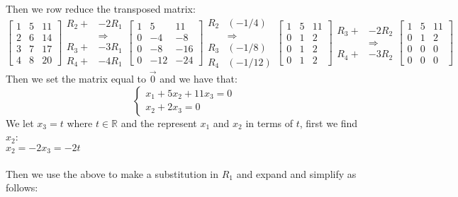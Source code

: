 \documentclass{article}
\begin{document}
Then we row reduce the transposed matrix: $$\begin{bmatrix}
    1 & 5 & 11\\
    2 & 6 & 14\\
    3 & 7 & 17\\
    4 & 8 & 20
\end{bmatrix}\begin{aligned}
    R_2 +& -2R_1\\
    &\Rightarrow\\
    R_3 +& -3R_1\\
    R_4 +& -4R_1
\end{aligned}\begin{bmatrix}
    1 & 5 & 11\\
    0 & -4 & -8\\
    0 & -8 & -16\\
    0 & -12 & -24
\end{bmatrix}\begin{aligned}
    R_2&(-1/4)\\
    &\Rightarrow\\
    R_3&(-1/8)\\
    R_4&(-1/12)
\end{aligned}\begin{bmatrix}
    1 & 5 & 11\\
    0 & 1 & 2\\
    0 & 1 & 2\\
    0 & 1 & 2
\end{bmatrix}\begin{aligned}
    R_3 +& -2R_2\\
    &\Rightarrow\\
    R_4 +& -3R_2
\end{aligned}\begin{bmatrix}
    1 & 5 & 11\\
    0 & 1 & 2\\
    0 & 0 & 0\\
    0 & 0 & 0
\end{bmatrix}$$
Then we set the matrix equal to $\vec{0}$ and we have that: $$\begin{cases}
    x_1+5x_2+11x_3=0\\
    x_2+2x_3=0
\end{cases}$$
We let $x_3=t$ where $t\in\mathbb{R}$ and the represent $x_1$ and $x_2$ in terms of $t$, first we find $x_2$:\\
$x_2=-2x_3=-2t$\\\\
Then we use the above to make a substitution in $R_1$ and expand and simplify as follows:\\
\end{document}
